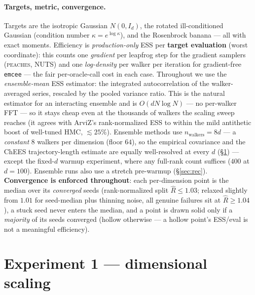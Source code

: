 \documentclass[11pt]{article}
\begin{document}
\paragraph{Targets, metric, convergence.} Targets are the isotropic Gaussian
$N(0,I_d)$, the rotated ill-conditioned Gaussian (condition number
$\kappa=e^{\log\kappa}$), and the Rosenbrock banana --- all with exact moments.
Efficiency is \emph{production-only} ESS per \textbf{target evaluation} (worst
coordinate): this counts one \emph{gradient} per leapfrog step for the gradient
samplers (\textsc{peaches}, NUTS) and one \emph{log-density} per walker per
iteration for gradient-free \texttt{emcee} --- the fair per-oracle-call cost in
each case. Throughout we use the \emph{ensemble-mean} ESS estimator: the
integrated autocorrelation of the walker-averaged series, rescaled by the pooled
variance ratio. This is the natural estimator for an interacting ensemble and is
$O(dN\log N)$ --- no per-walker FFT --- so it stays cheap even at the thousands
of walkers the scaling sweep reaches (it agrees with ArviZ's rank-normalized ESS
to within the mild antithetic boost of well-tuned HMC, $\lesssim\!25\%$).
Ensemble methods use $n_{\text{walkers}}=8d$ --- a \emph{constant} $8$ walkers
per dimension (floor $64$), so the empirical covariance and the ChEES
trajectory-length estimate are equally well-resolved at every $d$
(\S\ref{sec:scaling}) --- except the fixed-$d$ warmup experiment, where any
full-rank count suffices ($400$ at $d{=}100$). Ensemble runs also use a stretch
pre-warmup (\S\ref{sec:rec}).
\textbf{Convergence is enforced throughout}: each per-dimension point is the
median over its \emph{converged} seeds (rank-normalized split $\hat R\le1.03$;
relaxed slightly from $1.01$ for seed-median plus thinning noise, all genuine
failures sit at $\hat R\ge1.04$), a stuck seed never enters the median, and a
point is drawn solid only if a \emph{majority} of its seeds converged (hollow
otherwise --- a hollow point's ESS/eval is not a meaningful efficiency).

\section{Experiment 1 --- dimensional scaling}\label{sec:scaling}
\end{document}
